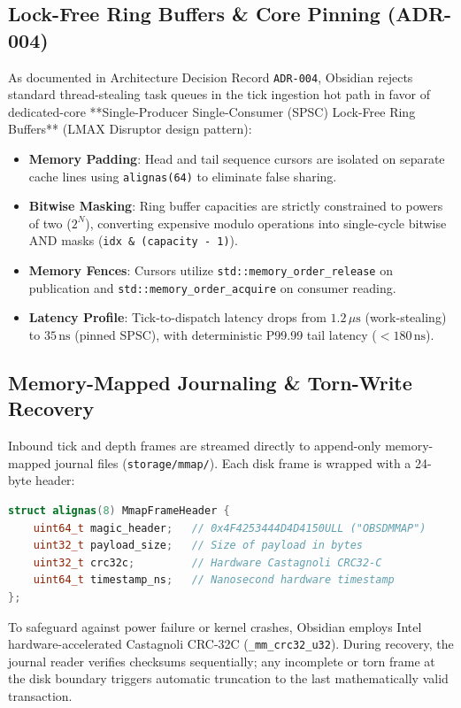 \documentclass[10pt,journal,compsoc]{IEEEtran}
\begin{document}
\subsection{Lock-Free Ring Buffers \& Core Pinning (ADR-004)}
As documented in Architecture Decision Record \texttt{ADR-004}, Obsidian rejects standard thread-stealing task queues in the tick ingestion hot path in favor of dedicated-core **Single-Producer Single-Consumer (SPSC) Lock-Free Ring Buffers** (LMAX Disruptor design pattern):
\begin{itemize}
    \item \textbf{Memory Padding}: Head and tail sequence cursors are isolated on separate cache lines using \texttt{alignas(64)} to eliminate false sharing.
    \item \textbf{Bitwise Masking}: Ring buffer capacities are strictly constrained to powers of two ($2^N$), converting expensive modulo operations into single-cycle bitwise AND masks (\texttt{idx \& (capacity - 1)}).
    \item \textbf{Memory Fences}: Cursors utilize \texttt{std::memory\_order\_release} on publication and \texttt{std::memory\_order\_acquire} on consumer reading.
    \item \textbf{Latency Profile}: Tick-to-dispatch latency drops from $1.2\,\mu\text{s}$ (work-stealing) to $35\,\text{ns}$ (pinned SPSC), with deterministic P99.99 tail latency ($< 180\,\text{ns}$).
\end{itemize}

\subsection{Memory-Mapped Journaling \& Torn-Write Recovery}
Inbound tick and depth frames are streamed directly to append-only memory-mapped journal files (\texttt{storage/mmap/}).
Each disk frame is wrapped with a 24-byte header:
\begin{lstlisting}[language=C++]
struct alignas(8) MmapFrameHeader {
    uint64_t magic_header;   // 0x4F4253444D4D4150ULL ("OBSDMMAP")
    uint32_t payload_size;   // Size of payload in bytes
    uint32_t crc32c;         // Hardware Castagnoli CRC32-C
    uint64_t timestamp_ns;   // Nanosecond hardware timestamp
};
\end{lstlisting}
To safeguard against power failure or kernel crashes, Obsidian employs Intel hardware-accelerated Castagnoli CRC-32C (\texttt{\_mm\_crc32\_u32}). During recovery, the journal reader verifies checksums sequentially; any incomplete or torn frame at the disk boundary triggers automatic truncation to the last mathematically valid transaction.
\end{document}
